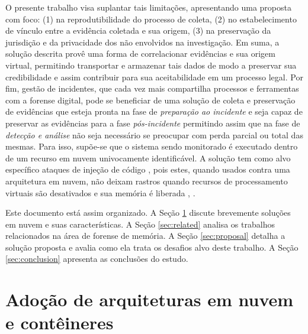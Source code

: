 \documentclass[conference]{IEEEtran}
\begin{document}
%
O presente trabalho visa suplantar tais limitações, apresentando uma proposta com foco: (1) na reprodutibilidade do processo de coleta, (2) no estabelecimento de vínculo entre a evidência coletada e sua origem, (3) na preservação da jurisdição e da privacidade dos não envolvidos na investigação.
%
Em suma, a solução descrita provê uma forma de correlacionar evidências e sua origem virtual, permitindo transportar e armazenar tais dados de modo a preservar sua credibilidade e assim contribuir para sua aceitabilidade em um processo legal.
%
Por fim, gestão de incidentes, que cada vez mais compartilha processos e ferramentas com a forense digital, pode se beneficiar de uma solução de coleta e preservação de evidências que esteja pronta na fase de \textit{preparação ao incidente} e seja capaz de preservar as evidências para a fase \textit{pós-incidente} permitindo assim que na fase de \textit{detecção e análise} não seja necessário se preocupar com perda parcial ou total das mesmas.
%
Para isso, supõe-se que o sistema sendo monitorado é executado dentro de um recurso em nuvem univocamente identificável.
%
A solução tem como alvo específico ataques de injeção de código \cite{Case_Memory_Forensics:2014}, pois estes, quando usados contra uma arquitetura em nuvem, não deixam rastros quando recursos de processamento virtuais são desativados e sua memória é liberada \cite{Vomel_Memory_Acquisition:2013}, \cite{Case_Memory_Forensics:2014}.
%


Este documento está assim organizado.
%
A Seção \ref{sec:cloud} discute brevemente soluções em nuvem e suas características.
%
A Seção \ref{sec:related} analisa os trabalhos relacionados na área de forense de memória.
%
A Seção \ref{sec:proposal} detalha a solução proposta e avalia como ela trata os desafios alvo deste trabalho.
%
A Seção \ref{sec:conclusion} apresenta as conclusões do estudo.



\section{Adoção de arquiteturas em nuvem e contêineres}
\label{sec:cloud}
\end{document}
